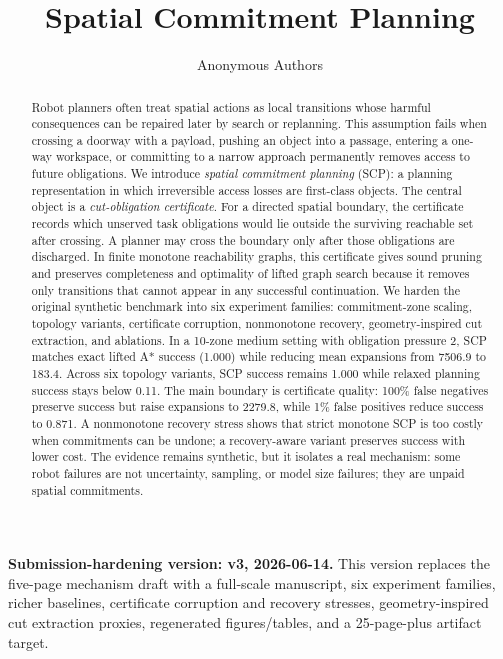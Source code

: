 \documentclass{article}
\title{Spatial Commitment Planning}
\author{Anonymous Authors}
\begin{document}
\maketitle
\noindent\textbf{Submission-hardening version: v3, 2026-06-14.} This version replaces the five-page mechanism draft with a full-scale manuscript, six experiment families, richer baselines, certificate corruption and recovery stresses, geometry-inspired cut extraction proxies, regenerated figures/tables, and a 25-page-plus artifact target.

\begin{abstract}
Robot planners often treat spatial actions as local transitions whose harmful consequences can be repaired later by search or replanning. This assumption fails when crossing a doorway with a payload, pushing an object into a passage, entering a one-way workspace, or committing to a narrow approach permanently removes access to future obligations. We introduce \emph{spatial commitment planning} (SCP): a planning representation in which irreversible access losses are first-class objects. The central object is a \emph{cut-obligation certificate}. For a directed spatial boundary, the certificate records which unserved task obligations would lie outside the surviving reachable set after crossing. A planner may cross the boundary only after those obligations are discharged. In finite monotone reachability graphs, this certificate gives sound pruning and preserves completeness and optimality of lifted graph search because it removes only transitions that cannot appear in any successful continuation. We harden the original synthetic benchmark into six experiment families: commitment-zone scaling, topology variants, certificate corruption, nonmonotone recovery, geometry-inspired cut extraction, and ablations. In a 10-zone medium setting with obligation pressure 2, SCP matches exact lifted A* success (1.000) while reducing mean expansions from 7506.9 to 183.4. Across six topology variants, SCP success remains 1.000 while relaxed planning success stays below 0.11. The main boundary is certificate quality: 100\% false negatives preserve success but raise expansions to 2279.8, while 1\% false positives reduce success to 0.871. A nonmonotone recovery stress shows that strict monotone SCP is too costly when commitments can be undone; a recovery-aware variant preserves success with lower cost. The evidence remains synthetic, but it isolates a real mechanism: some robot failures are not uncertainty, sampling, or model size failures; they are unpaid spatial commitments.
\end{abstract}
\end{document}
